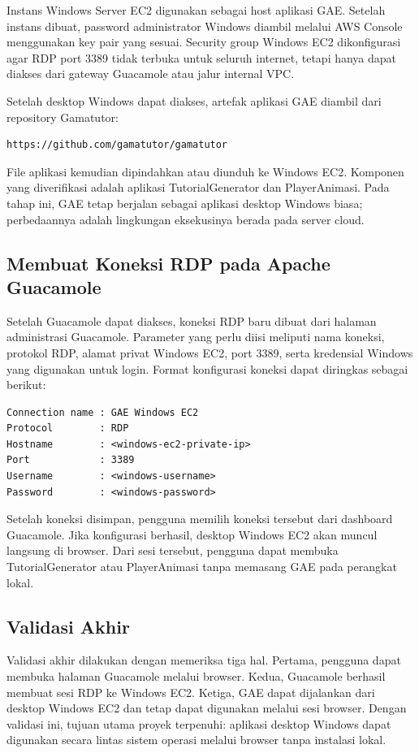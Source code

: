 \documentclass[conference]{IEEEtran}
\begin{document}
Instans Windows Server EC2 digunakan sebagai host aplikasi GAE. Setelah instans dibuat, password administrator Windows diambil melalui AWS Console menggunakan key pair yang sesuai. Security group Windows EC2 dikonfigurasi agar RDP port 3389 tidak terbuka untuk seluruh internet, tetapi hanya dapat diakses dari gateway Guacamole atau jalur internal VPC.

Setelah desktop Windows dapat diakses, artefak aplikasi GAE diambil dari repository Gamatutor:

\begin{lstlisting}[style=code]
https://github.com/gamatutor/gamatutor
\end{lstlisting}

File aplikasi kemudian dipindahkan atau diunduh ke Windows EC2. Komponen yang diverifikasi adalah aplikasi TutorialGenerator dan PlayerAnimasi. Pada tahap ini, GAE tetap berjalan sebagai aplikasi desktop Windows biasa; perbedaannya adalah lingkungan eksekusinya berada pada server cloud.

\subsection{Membuat Koneksi RDP pada Apache Guacamole}

Setelah Guacamole dapat diakses, koneksi RDP baru dibuat dari halaman administrasi Guacamole. Parameter yang perlu diisi meliputi nama koneksi, protokol RDP, alamat privat Windows EC2, port 3389, serta kredensial Windows yang digunakan untuk login. Format konfigurasi koneksi dapat diringkas sebagai berikut:

\begin{lstlisting}[style=code]
Connection name : GAE Windows EC2
Protocol        : RDP
Hostname        : <windows-ec2-private-ip>
Port            : 3389
Username        : <windows-username>
Password        : <windows-password>
\end{lstlisting}

Setelah koneksi disimpan, pengguna memilih koneksi tersebut dari dashboard Guacamole. Jika konfigurasi berhasil, desktop Windows EC2 akan muncul langsung di browser. Dari sesi tersebut, pengguna dapat membuka TutorialGenerator atau PlayerAnimasi tanpa memasang GAE pada perangkat lokal.

\subsection{Validasi Akhir}

Validasi akhir dilakukan dengan memeriksa tiga hal. Pertama, pengguna dapat membuka halaman Guacamole melalui browser. Kedua, Guacamole berhasil membuat sesi RDP ke Windows EC2. Ketiga, GAE dapat dijalankan dari desktop Windows EC2 dan tetap dapat digunakan melalui sesi browser. Dengan validasi ini, tujuan utama proyek terpenuhi: aplikasi desktop Windows dapat digunakan secara lintas sistem operasi melalui browser tanpa instalasi lokal.
\end{document}
